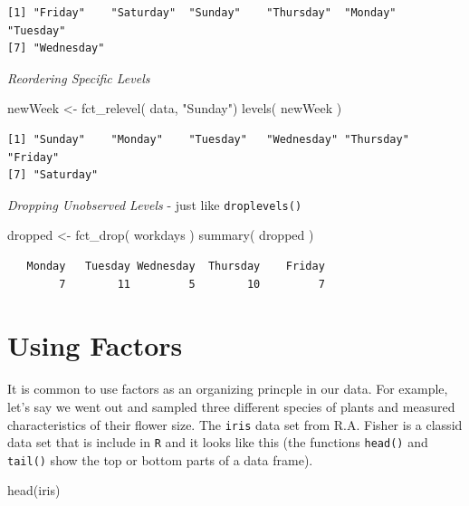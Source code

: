 \documentclass[
  letterpaper,
]{book}
\newenvironment{Shaded}{\begin{snugshade}}{\end{snugshade}}
\newcommand{\FunctionTok}[1]{\textcolor[rgb]{0.28,0.35,0.67}{#1}}
\newcommand{\NormalTok}[1]{\textcolor[rgb]{0.00,0.23,0.31}{#1}}
\newcommand{\OtherTok}[1]{\textcolor[rgb]{0.00,0.23,0.31}{#1}}
\newcommand{\StringTok}[1]{\textcolor[rgb]{0.13,0.47,0.30}{#1}}
\begin{document}
\begin{verbatim}
[1] "Friday"    "Saturday"  "Sunday"    "Thursday"  "Monday"    "Tuesday"  
[7] "Wednesday"
\end{verbatim}

\emph{Reordering Specific Levels}

\begin{Shaded}
\begin{Highlighting}[]
\NormalTok{newWeek }\OtherTok{\textless{}{-}} \FunctionTok{fct\_relevel}\NormalTok{( data, }\StringTok{"Sunday"}\NormalTok{)}
\FunctionTok{levels}\NormalTok{( newWeek )}
\end{Highlighting}
\end{Shaded}

\begin{verbatim}
[1] "Sunday"    "Monday"    "Tuesday"   "Wednesday" "Thursday"  "Friday"   
[7] "Saturday" 
\end{verbatim}

\emph{Dropping Unobserved Levels} - just like \texttt{droplevels()}

\begin{Shaded}
\begin{Highlighting}[]
\NormalTok{dropped }\OtherTok{\textless{}{-}} \FunctionTok{fct\_drop}\NormalTok{( workdays )}
\FunctionTok{summary}\NormalTok{( dropped )}
\end{Highlighting}
\end{Shaded}

\begin{verbatim}
   Monday   Tuesday Wednesday  Thursday    Friday 
        7        11         5        10         7 
\end{verbatim}

\section{Using Factors}\label{using-factors}

It is common to use factors as an organizing princple in our data. For
example, let's say we went out and sampled three different species of
plants and measured characteristics of their flower size. The
\texttt{iris} data set from R.A. Fisher is a classid data set that is
include in \texttt{R} and it looks like this (the functions
\texttt{head()} and \texttt{tail()} show the top or bottom parts of a
data frame).

\begin{Shaded}
\begin{Highlighting}[]
\FunctionTok{head}\NormalTok{(iris)}
\end{Highlighting}
\end{Shaded}
\end{document}
